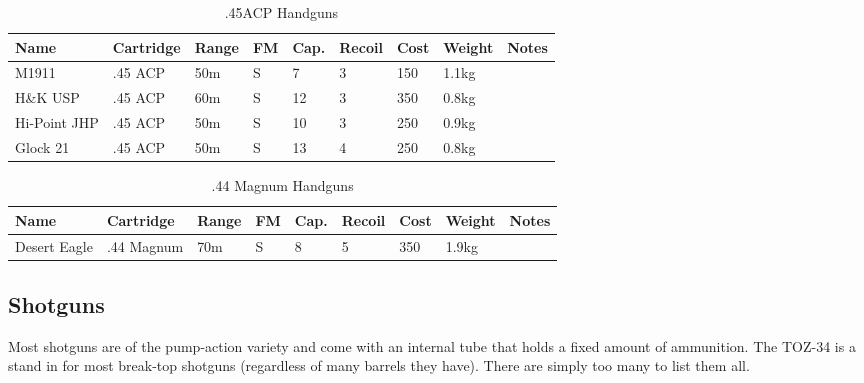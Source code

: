 \begin{table}
  \caption{.45ACP Handguns}
  \label{tab:Handguns45}
  \begin{center}
    \begin{tabular}{| l | l | l | l | l | l | l | l | l |}
      \hline
      \textbf{Name} & \textbf{Cartridge} & \textbf{Range} &
      \textbf{FM} & \textbf{Cap.} & \textbf{Recoil} &
      \textbf{Cost} & \textbf{Weight} & \textbf{Notes} \\ \hline

      M1911        & .45 ACP & 50m & S &  7 & 3  & 150 & 1.1kg & \\ \hline
      H\&K USP     & .45 ACP & 60m & S & 12 & 3  & 350 & 0.8kg & \\ \hline
      Hi-Point JHP & .45 ACP & 50m & S & 10 & 3  & 250 & 0.9kg & \\ \hline
      Glock 21     & .45 ACP & 50m & S & 13 & 4  & 250 & 0.8kg & \\ \hline

    \end{tabular}
  \end{center}
\end{table}

\begin{table}
  \caption{.44 Magnum Handguns}
  \label{tab:Handguns44}
  \begin{center}
    \begin{tabular}{| l | l | l | l | l | l | l | l | l |}
      \hline
      \textbf{Name} & \textbf{Cartridge} & \textbf{Range} &
      \textbf{FM} & \textbf{Cap.} & \textbf{Recoil} &
      \textbf{Cost} & \textbf{Weight} & \textbf{Notes} \\ \hline

      Desert Eagle & .44 Magnum & 70m & S & 8 & 5 & 350 & 1.9kg & \\ \hline

    \end{tabular}
  \end{center}
\end{table}

\subsection{Shotguns}
\label{sub:10-Shotguns}

Most shotguns are of the pump-action variety and come with an internal tube that
holds a fixed amount of ammunition. The TOZ-34 is a stand in for most break-top
shotguns (regardless of many barrels they have). There are simply too many to
list them all.

